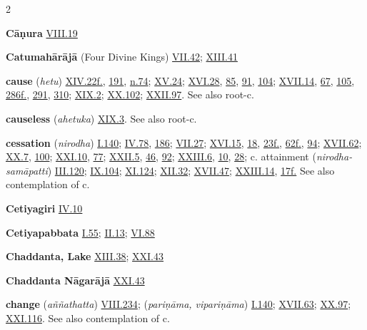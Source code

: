 \begin{multicols}{2}
\begin{vismHanging}
\par\textbf{Cāṇura} \hyperlink{VIII.19}{VIII.19}{}
\par\textbf{Catumahārājā} (Four Divine Kings) \hyperlink{VII.42}{VII.42}{}; \hyperlink{XIII.41}{XIII.41}{}
\par\textbf{cause} (\emph{hetu}) \hyperlink{XIV.22}{XIV.22f.}{}, \hyperlink{XIV.191}{191}{}, \hyperlink{XIV.n74}{n.74}{}; \hyperlink{XV.24}{XV.24}{}; \hyperlink{XVI.28}{XVI.28}{}, \hyperlink{XVI.85}{85}{}, \hyperlink{XVI.91}{91}{}, \hyperlink{XVI.104}{104}{}; \hyperlink{XVII.14}{XVII.14}{}, \hyperlink{XVII.67}{67}{}, \hyperlink{XVII.105}{105}{}, \hyperlink{XVII.286}{286f.}{}, \hyperlink{XVII.291}{291}{}, \hyperlink{XVII.310}{310}{}; \hyperlink{XIX.2}{XIX.2}{}; \hyperlink{XX.102}{XX.102}{}; \hyperlink{XXII.97}{XXII.97}{}. See also root-c. 
\par\textbf{causeless} (\emph{ahetuka}) \hyperlink{XIX.3}{XIX.3}{}. See also root-c.
\par\textbf{cessation} (\emph{nirodha}) \hyperlink{I.140}{I.140}{}; \hyperlink{IV.78}{IV.78}{}, \hyperlink{IV.186}{186}{}; \hyperlink{VII.27}{VII.27}{}; \hyperlink{XVI.15}{XVI.15}{}, \hyperlink{XVI.18}{18}{}, \hyperlink{XVI.23}{23f.}{}, \hyperlink{XVI.62}{62f.}{}, \hyperlink{XVI.94}{94}{}; \hyperlink{XVII.62}{XVII.62}{}; \hyperlink{XX.7}{XX.7}{}, \hyperlink{XX.100}{100}{}; \hyperlink{XXI.10}{XXI.10}{}, \hyperlink{XXI.77}{77}{}; \hyperlink{XXII.5}{XXII.5}{}, \hyperlink{XXII.46}{46}{}, \hyperlink{XXII.92}{92}{}; \hyperlink{XXIII.6}{XXIII.6}{}, \hyperlink{XXIII.10}{10}{}, \hyperlink{XXIII.28}{28}{}; c. attainment (\emph{nirodha-samāpatti}) \hyperlink{III.120}{III.120}{}; \hyperlink{IX.104}{IX.104}{}; \hyperlink{XI.124}{XI.124}{}; \hyperlink{XII.32}{XII.32}{}; \hyperlink{XVII.47}{XVII.47}{}; \hyperlink{XXIII.14}{XXIII.14}{}, \hyperlink{XXIII.17}{17f.}{} See also contemplation of c. 
\par\textbf{Cetiyagiri} \hyperlink{IV.10}{IV.10}{}
\par\textbf{Cetiyapabbata} \hyperlink{I.55}{I.55}{}; \hyperlink{II.13}{II.13}{}; \hyperlink{VI.88}{VI.88}{}
\par\textbf{Chaddanta, Lake} \hyperlink{XIII.38}{XIII.38}{}; \hyperlink{XXI.43}{XXI.43}{}
\par\textbf{Chaddanta Nāgarājā} \hyperlink{XXI.43}{XXI.43}{}
\par\textbf{change} (\emph{aññathatta}) \hyperlink{VIII.234}{VIII.234}{}; (\emph{pariṇāma, vipariṇāma}) \hyperlink{I.140}{I.140}{}; \hyperlink{XVII.63}{XVII.63}{}; \hyperlink{XX.97}{XX.97}{}; \hyperlink{XXI.116}{XXI.116}{}. See also contemplation of c.

\end{vismHanging}
\end{multicols}
